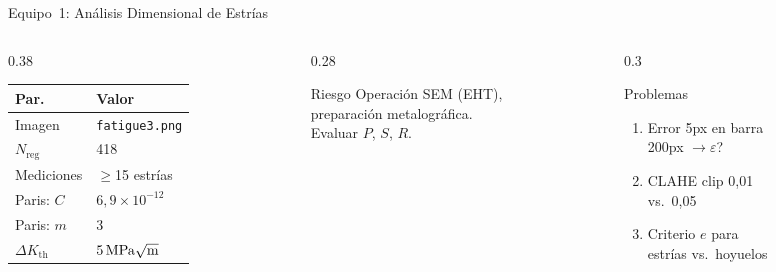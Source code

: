 \documentclass[aspectratio=169,12pt]{beamer}
\begin{document}
\begin{frame}{Equipo~1: Análisis Dimensional de Estrías}
	\begin{columns}
		\begin{column}{0.38\textwidth}
			\centering\scriptsize
			\begin{tabular}{ll}
				\toprule
				\textbf{Par.}          & \textbf{Valor}            \\
				\midrule
				Imagen                 & \texttt{fatigue3.png}     \\
				$N_\mathrm{reg}$       & 418                       \\
				Mediciones             & $\geq$15 estrías          \\
				Paris: $C$             & $6{,}9\!\times\!10^{-12}$ \\
				Paris: $m$             & 3                         \\
				$\Delta K_\mathrm{th}$ & $\SI{5}{\MPa\sqrt{\m}}$   \\
				\bottomrule
			\end{tabular}
		\end{column}
		\begin{column}{0.28\textwidth}
			\begin{alertblock}{\scriptsize Riesgo}
				\scriptsize
				Operación SEM (EHT),\\
				preparación metalográfica.\\
				Evaluar $P$, $S$, $R$.
			\end{alertblock}
		\end{column}
		\begin{column}{0.3\textwidth}
			\begin{exampleblock}{\scriptsize Problemas}
				\scriptsize
				\begin{enumerate}
					\item[P1.1] Error 5px en barra\\
					      200px $\to \varepsilon$?
					\item[P1.2] CLAHE clip 0,01\\
					      vs.\ 0,05
					\item[P1.3] Criterio $e$ para\\
					      estrías vs.\ hoyuelos
				\end{enumerate}
			\end{exampleblock}
		\end{column}
	\end{columns}
\end{frame}
\end{document}

